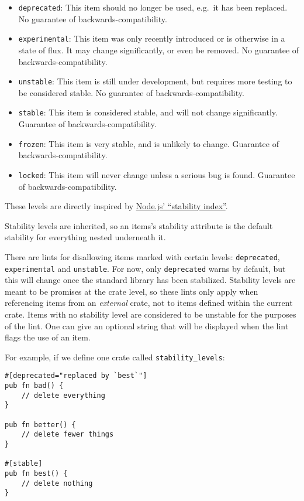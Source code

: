 \documentclass[]{article}
\begin{document}
\begin{itemize}
\itemsep1pt\parskip0pt
\item
  \texttt{deprecated}: This item should no longer be used, e.g.~it has
  been replaced. No guarantee of backwards-compatibility.
\item
  \texttt{experimental}: This item was only recently introduced or is
  otherwise in a state of flux. It may change significantly, or even be
  removed. No guarantee of backwards-compatibility.
\item
  \texttt{unstable}: This item is still under development, but requires
  more testing to be considered stable. No guarantee of
  backwards-compatibility.
\item
  \texttt{stable}: This item is considered stable, and will not change
  significantly. Guarantee of backwards-compatibility.
\item
  \texttt{frozen}: This item is very stable, and is unlikely to change.
  Guarantee of backwards-compatibility.
\item
  \texttt{locked}: This item will never change unless a serious bug is
  found. Guarantee of backwards-compatibility.
\end{itemize}

These levels are directly inspired by
\href{http://nodejs.org/api/documentation.html}{Node.js' ``stability
index''}.

Stability levels are inherited, so an items's stability attribute is the
default stability for everything nested underneath it.

There are lints for disallowing items marked with certain levels:
\texttt{deprecated}, \texttt{experimental} and \texttt{unstable}. For
now, only \texttt{deprecated} warns by default, but this will change
once the standard library has been stabilized. Stability levels are
meant to be promises at the crate level, so these lints only apply when
referencing items from an \emph{external} crate, not to items defined
within the current crate. Items with no stability level are considered
to be unstable for the purposes of the lint. One can give an optional
string that will be displayed when the lint flags the use of an item.

For example, if we define one crate called \texttt{stability\_levels}:

\begin{verbatim}
#[deprecated="replaced by `best`"]
pub fn bad() {
    // delete everything
}

pub fn better() {
    // delete fewer things
}

#[stable]
pub fn best() {
    // delete nothing
}
\end{verbatim}
\end{document}
